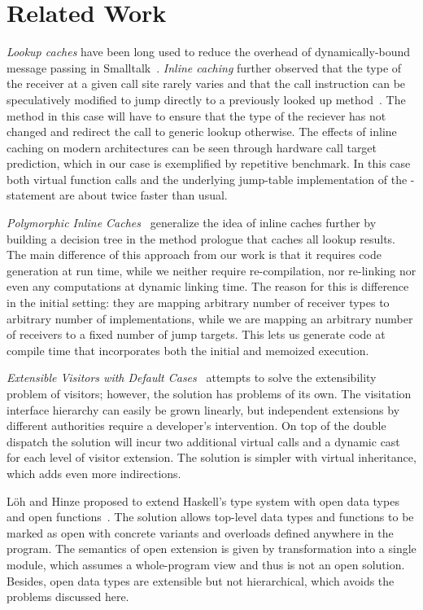 \section{Related Work} %
\label{sec:rw}

\emph{Lookup caches} have been long used to reduce the overhead of 
dynamically-bound message passing in Smalltalk~\cite{UngarPatterson83}. 
\emph{Inline caching} further observed that the type of the receiver at a given 
call site rarely varies and that the call instruction can be speculatively 
modified to jump directly to a previously looked up method~\cite{Deutsch84}. 
The method in this case will have to ensure that the type of the reciever has 
not changed and redirect the call to generic lookup otherwise. The effects of 
inline caching on modern architectures can be seen through hardware call target 
prediction, which in our case is exemplified by repetitive benchmark. In this 
case both virtual function calls and the underlying jump-table implementation of 
the -statement are about twice faster than usual.

\emph{Polymorphic Inline Caches}~\cite{Holzle:Chambers:Ungar:91} generalize the 
idea of inline caches further by building a decision tree in the method prologue 
that caches all lookup results. The main difference of this approach from our 
work is that it requires code generation at run time, while we neither require 
re-compilation, nor re-linking nor even any computations at dynamic linking 
time. The reason for this is difference in the initial setting: they are mapping 
arbitrary number of receiver types to arbitrary number of implementations, while 
we are mapping an arbitrary number of receivers to a fixed number of jump 
targets. This lets us generate code at compile time that incorporates both the 
initial and memoized execution.

\emph{Extensible Visitors with Default Cases}~\cite[]{Zenger:2001} attempts to solve the extensibility problem of visitors; 
however, the solution has problems of its own. The visitation interface 
hierarchy can easily be grown linearly, but independent extensions by different  
authorities require a developer's intervention. On top of the double dispatch the 
solution will incur two additional virtual calls and a dynamic cast for each 
level of visitor extension. The solution is simpler with virtual inheritance, 
which adds even more indirections.

L\"{o}h and Hinze proposed to extend Haskell's type system with open data types 
and open functions~\cite{LohHinze2006}. The solution allows top-level data types 
and functions to be marked as open with concrete variants and overloads defined 
anywhere in the program. The semantics of open extension is given by 
transformation into a single module, which assumes a whole-program view and thus 
is not an open solution. Besides, open data types are extensible but not 
hierarchical, which avoids the problems discussed here.

